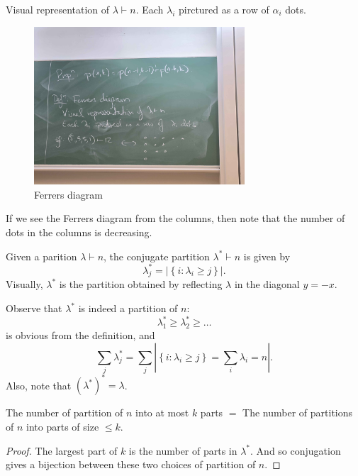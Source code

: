 \begin{definition}
    Visual representation of \(\lambda \vdash n\). Each \(\lambda _i\) pirctured as a row of \(\alpha _i\) dots.    
\end{definition}
\begin{figure}[H]
    \centering
    \includegraphics[width=0.7\textwidth]{./Figures/20250923_153141.jpg}
    \caption{Ferrers diagram}
    \label{fig:Ferrers}
\end{figure}

\begin{note}
    If we see the Ferrers diagram from the columns, then note that the number of dots in the columns is decreasing.
\end{note}

\begin{definition}
    Given a parition \(\lambda \vdash n\), the conjugate partition \(\lambda ^* \vdash n\) is given by 
    \[
        \lambda _j^* = \left\vert \left\{ i: \lambda _i \ge j \right\}  \right\vert. 
    \] 
    Visually, \(\lambda ^*\) is the partition obtained by reflecting \(\lambda  \) in the diagonal \(y = -x\).     
\end{definition}

Observe that \(\lambda ^*\) is indeed a partition of \(n\):
\[
    \lambda _1^* \ge \lambda _2^* \ge \dots 
\] is obvious from the definition, and 
\[
    \sum_{j} \lambda_j ^* = \sum_{j} \left\vert \left\{ i: \lambda _i \ge j \right\} = \sum_{i} \lambda _i = n   \right\vert.   
\]
Also, note that \(\left( \lambda ^* \right)^* = \lambda \). 

\begin{proposition}
    The number of partition of \(n\) into at most \(k\) parts \(=\) The number of partitions of \(n\) into parts of size \(\le k\).     
\end{proposition}
\begin{proof}
    The largest part of \(k\) is the number of parts in \(\lambda ^*\). And so conjugation gives a bijection between these two choices of partition of \(n\).   
\end{proof}

